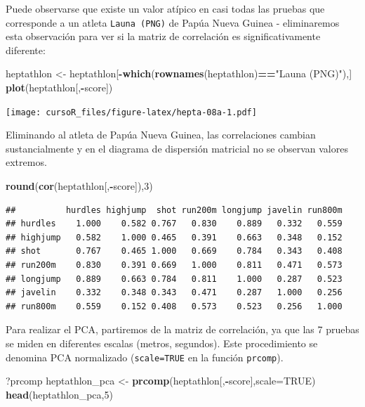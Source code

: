 \documentclass[]{book}
\newenvironment{Shaded}{\begin{snugshade}}{\end{snugshade}}
\newcommand{\KeywordTok}[1]{\textcolor[rgb]{0.13,0.29,0.53}{\textbf{#1}}}
\newcommand{\DataTypeTok}[1]{\textcolor[rgb]{0.13,0.29,0.53}{#1}}
\newcommand{\DecValTok}[1]{\textcolor[rgb]{0.00,0.00,0.81}{#1}}
\newcommand{\StringTok}[1]{\textcolor[rgb]{0.31,0.60,0.02}{#1}}
\newcommand{\OtherTok}[1]{\textcolor[rgb]{0.56,0.35,0.01}{#1}}
\newcommand{\OperatorTok}[1]{\textcolor[rgb]{0.81,0.36,0.00}{\textbf{#1}}}
\newcommand{\NormalTok}[1]{#1}
\begin{document}
Puede observarse que existe un valor atípico en casi todas las pruebas
que corresponde a un atleta \texttt{Launa\ (PNG)} de Papúa Nueva Guinea
- eliminaremos esta observación para ver si la matriz de correlación es
significativamente diferente:

\begin{Shaded}
\begin{Highlighting}[]
\NormalTok{heptathlon <-}\StringTok{ }\NormalTok{heptathlon[}\OperatorTok{-}\KeywordTok{which}\NormalTok{(}\KeywordTok{rownames}\NormalTok{(heptathlon)}\OperatorTok{==}\StringTok{"Launa (PNG)"}\NormalTok{),]}
\KeywordTok{plot}\NormalTok{(heptathlon[,}\OperatorTok{-}\NormalTok{score])}
\end{Highlighting}
\end{Shaded}

\texttt{[image: cursoR\_files/figure-latex/hepta-08a-1.pdf]}

Eliminando al atleta de Papúa Nueva Guinea, las correlaciones cambian
sustancialmente y en el diagrama de dispersión matricial no se observan
valores extremos.

\begin{Shaded}
\begin{Highlighting}[]
\KeywordTok{round}\NormalTok{(}\KeywordTok{cor}\NormalTok{(heptathlon[,}\OperatorTok{-}\NormalTok{score]),}\DecValTok{3}\NormalTok{)}
\end{Highlighting}
\end{Shaded}

\begin{verbatim}
##          hurdles highjump  shot run200m longjump javelin run800m
## hurdles    1.000    0.582 0.767   0.830    0.889   0.332   0.559
## highjump   0.582    1.000 0.465   0.391    0.663   0.348   0.152
## shot       0.767    0.465 1.000   0.669    0.784   0.343   0.408
## run200m    0.830    0.391 0.669   1.000    0.811   0.471   0.573
## longjump   0.889    0.663 0.784   0.811    1.000   0.287   0.523
## javelin    0.332    0.348 0.343   0.471    0.287   1.000   0.256
## run800m    0.559    0.152 0.408   0.573    0.523   0.256   1.000
\end{verbatim}

Para realizar el PCA, partiremos de la matriz de correlación, ya que las
7 pruebas se miden en diferentes escalas (metros, segundos). Este
procedimiento se denomina PCA normalizado (\texttt{scale=TRUE} en la
función \texttt{prcomp}).

\begin{Shaded}
\begin{Highlighting}[]
\NormalTok{?prcomp}
\NormalTok{heptathlon_pca <-}\StringTok{ }\KeywordTok{prcomp}\NormalTok{(heptathlon[,}\OperatorTok{-}\NormalTok{score],}\DataTypeTok{scale=}\OtherTok{TRUE}\NormalTok{)}
\KeywordTok{head}\NormalTok{(heptathlon_pca,}\DecValTok{5}\NormalTok{)}
\end{Highlighting}
\end{Shaded}
\end{document}
